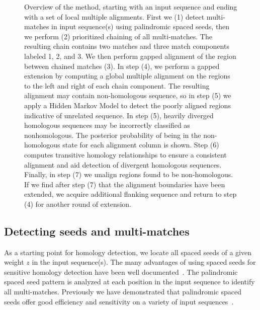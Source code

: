 \documentclass{ws-procs9x6}
\begin{document}
\begin{figure}[p]
\begin{center}
\end{center}
\caption{Overview of the method, starting with an input sequence and ending with a set of local multiple alignments. First we (1) detect multi-matches in input sequence(s) using palindromic spaced seeds, then we perform (2) prioritized chaining of all multi-matches.  The resulting chain contains two matches and three match components labeled 1, 2, and 3.  We then perform gapped alignment of the region between chained matches (3).   In step (4), we perform a gapped extension by computing a global multiple alignment on the regions to the left and right of each chain component.  The resulting alignment may contain non-homologous sequence, so in step (5) we apply a Hidden Markov Model to detect the poorly aligned regions indicative of unrelated sequence.  In step (5), heavily diverged homologous sequences may be incorrectly classified as nonhomologous. The posterior probability of being in the non-homologous state for each alignment column is shown.  Step (6) computes transitive homology relationships to ensure a consistent alignment and aid detection of divergent homologous sequences.  Finally, in step (7) we unalign regions found to be non-homologous.  If we find after step (7) that the alignment boundaries have been extended, we acquire additional flanking sequence and return to step (4) for another round of extension.}
\label{fig-main}
\end{figure}



\subsection{Detecting seeds and multi-matches}

As a starting point for homology detection, we locate all spaced seeds of a given weight $z$ in the input sequence(s). The many advantages of using spaced seeds for sensitive homology detection have been well documented~\cite{ref-spacedseeds, ref-pattern}. The palindromic spaced seed pattern is analyzed at each position in the input sequence to identify all multi-matches.  Previously we have demonstrated that palindromic spaced seeds offer good efficiency and sensitivity on a variety of input sequences~\cite{ref-procrast}.
\end{document}
